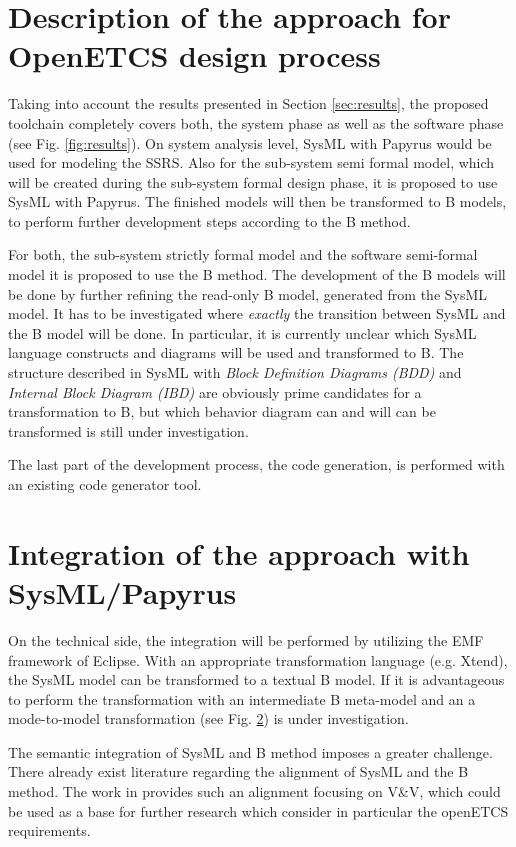 \section{Description of the approach for OpenETCS design process}

Taking into account the results presented in Section
\ref{sec:results}, the proposed toolchain completely covers both, the
system phase as well as the software phase (see
Fig. \ref{fig:results}). On system analysis level, SysML with Papyrus
would be used for modeling the SSRS. Also for the sub-system semi
formal model, which will be created during the sub-system formal
design phase, it is proposed to use SysML with Papyrus. The finished
models will then be transformed to B models, to perform further
development steps according to the B method.

For both, the sub-system strictly formal model and the software
semi-formal model it is proposed to use the B method. The development
of the B models will be done by further refining the read-only B
model, generated from the SysML model. It has to be investigated where
\emph{exactly} the transition between SysML and the B model will be
done. In particular, it is currently unclear which SysML language
constructs and diagrams will be used and transformed to B. The
structure described in SysML with \emph{Block Definition Diagrams
  (BDD)} and \emph{Internal Block Diagram (IBD)} are obviously prime
candidates for a transformation to B, but which behavior diagram can
and will can be transformed is still under investigation.

The last part of the development process, the code generation, is
performed with an existing code generator tool.

\section{Integration of the approach with SysML/Papyrus}

On the technical side, the integration will be performed by utilizing
the EMF framework of Eclipse. With an appropriate transformation
language (e.g. Xtend), the SysML model can be transformed to a textual
B model. If it is advantageous to perform the transformation with an
intermediate B meta-model and an a mode-to-model transformation (see
Fig. \ref{}) is under investigation.

The semantic integration of SysML and B method imposes a greater
challenge. There already exist literature regarding the alignment of
SysML and the B method. The work in \cite{} provides such an alignment
focusing on V\&V, which could be used as a base for further research
which consider in particular the openETCS requirements.


